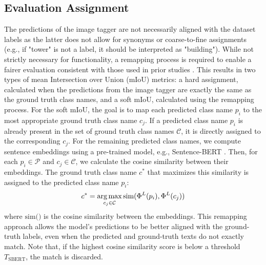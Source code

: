 \subsection{Evaluation Assignment}
\label{sec:assignment}
The predictions of the image tagger are not necessarily aligned with the dataset labels as the latter does not allow for synonyms or coarse-to-fine assignments (e.g., if "tower" is not a label, it should be interpreted as "building"). While not strictly necessary for functionality, a remapping process is required to enable a fairer evaluation consistent with those used in prior studies \cite{kawano2024tag,rewatbowornwong2023zero}. This results in two types of mean Intersection over Union (mIoU) metrics: a hard assignment, calculated when the predictions from the image tagger are exactly the same as the ground truth class names, and a soft mIoU, calculated using the remapping process.
For the soft mIoU, the goal is to map each predicted class name $p_i$ to the most appropriate ground truth class name $c_j$. If a predicted class name $p_i$ is already present in the set of ground truth class names $\mathcal{C}$, it is directly assigned to the corresponding $c_j$.
For the remaining predicted class names, we compute sentence embeddings using a pre-trained model, e.g., Sentence-BERT \cite{reimers2019sentence}. Then, for each $p_i \in \mathcal{P}$ and $c_j \in \mathcal{C}$, we calculate the cosine similarity between their embeddings. The ground truth class name $c^*$ that maximizes this similarity is assigned to the predicted class name $p_i$:
\begin{equation}
    c^* = \operatorname*{arg\,max}_{c_j \in \mathcal{C}} \text{sim}(\Phi^L(p_i), \Phi^L(c_j))
\end{equation}
where $\text{sim()}$ is the cosine similarity between the embeddings.
This remapping approach allows the model's predictions to be better aligned with the ground-truth labels, even when the predicted and ground-truth texts do not exactly match. Note that, if the highest cosine similarity score is below a threshold $T_\text{SBERT}$, the match is discarded.
